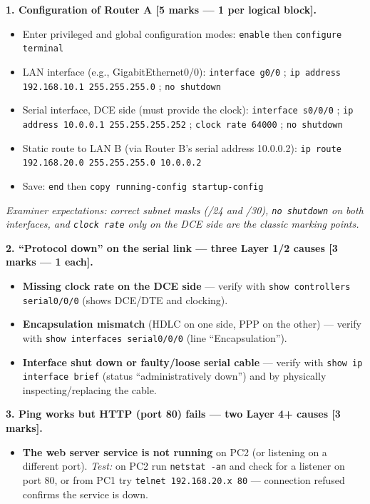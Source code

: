 \documentclass[11pt]{article}
\begin{document}
\begin{corrige}
\textbf{1. Configuration of Router A [5 marks — 1 per logical block].}
\begin{itemize}
\item Enter privileged and global configuration modes:
\texttt{enable} then \texttt{configure terminal}
\item LAN interface (e.g., GigabitEthernet0/0):
\texttt{interface g0/0} ; \texttt{ip address 192.168.10.1 255.255.255.0} ; \texttt{no shutdown}
\item Serial interface, DCE side (must provide the clock):
\texttt{interface s0/0/0} ; \texttt{ip address 10.0.0.1 255.255.255.252} ; \texttt{clock rate 64000} ; \texttt{no shutdown}
\item Static route to LAN B (via Router B's serial address 10.0.0.2):
\texttt{ip route 192.168.20.0 255.255.255.0 10.0.0.2}
\item Save: \texttt{end} then \texttt{copy running-config startup-config}
\end{itemize}
\emph{Examiner expectations: correct subnet masks (/24 and /30), \texttt{no shutdown} on both interfaces, and \texttt{clock rate} only on the DCE side are the classic marking points.}
\par
\textbf{2. ``Protocol down'' on the serial link — three Layer 1/2 causes [3 marks — 1 each].}
\begin{itemize}
\item \textbf{Missing clock rate on the DCE side} — verify with \texttt{show controllers serial0/0/0} (shows DCE/DTE and clocking).
\item \textbf{Encapsulation mismatch} (HDLC on one side, PPP on the other) — verify with \texttt{show interfaces serial0/0/0} (line ``Encapsulation'').
\item \textbf{Interface shut down or faulty/loose serial cable} — verify with \texttt{show ip interface brief} (status ``administratively down'') and by physically inspecting/replacing the cable.
\end{itemize}
\textbf{3. Ping works but HTTP (port 80) fails — two Layer 4+ causes [3 marks].}
\begin{itemize}
\item \textbf{The web server service is not running} on PC2 (or listening on a different port). \emph{Test:} on PC2 run \texttt{netstat -an} and check for a listener on port 80, or from PC1 try \texttt{telnet 192.168.20.x 80} — connection refused confirms the service is down.

\end{itemize}
\end{corrige}
\end{document}
